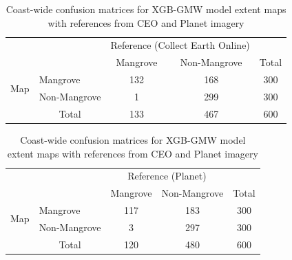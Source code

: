 \begin{table}[htbp]
    \caption{Coast-wide confusion matrices for XGB-GMW model extent maps with references from CEO and Planet imagery}
    \centering

    \begin{tabular}{l|l|c|c|c}
    \multicolumn{2}{c}{}&\multicolumn{2}{c}{Reference (Collect Earth Online)}&\\
    \cline{3-4}
    \multicolumn{2}{c|}{}&Mangrove&Non-Mangrove&\multicolumn{1}{c}{Total}\\
    \cline{2-4}
    \multirow{2}{*}{Map}&Mangrove& 132 & 168 & 300\\
    \cline{2-4}
    & Non-Mangrove & 1 & 299 & 300\\
    \cline{2-4}
    \multicolumn{1}{c}{} & \multicolumn{1}{c}{Total} & \multicolumn{1}{c}{133} & \multicolumn{1}{c}{467} & \multicolumn{1}{c}{600}\\
    \end{tabular}

    \vspace{1.5em}

    \begin{tabular}{l|l|c|c|c}
    \multicolumn{2}{c}{}&\multicolumn{2}{c}{Reference (Planet)}&\\
    \cline{3-4}
    \multicolumn{2}{c|}{}&Mangrove&Non-Mangrove&\multicolumn{1}{c}{Total}\\
    \cline{2-4}
    \multirow{2}{*}{Map}&Mangrove& 117 & 183 & 300\\
    \cline{2-4}
    & Non-Mangrove & 3 & 297 & 300\\
    \cline{2-4}
    \multicolumn{1}{c}{} & \multicolumn{1}{c}{Total} & \multicolumn{1}{c}{120} & \multicolumn{1}{c}{480} & \multicolumn{1}{c}{600}\\
    \end{tabular}
\end{table}
